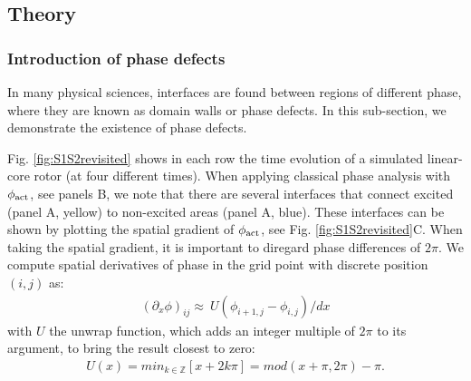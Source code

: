 \documentclass{article}
\newcommand{\phiact}{\ensuremath{\phi_{\rm act}}}
\begin{document}

\subsection{Theory}\label{sec:theory}

\subsubsection{Introduction of phase defects}

In many physical sciences, interfaces are found between regions of different phase, where they are known as domain walls or phase defects. In this sub-section, we demonstrate the existence of phase defects. 

Fig. \ref{fig:S1S2revisited} shows in each row the time evolution of a simulated linear-core rotor (at four different times). When applying classical phase analysis with $\phiact$, see panels B, we note that there are several interfaces that connect excited (panel A, yellow) to non-excited areas (panel A, blue). These interfaces can be shown by plotting the spatial gradient of $\phiact$, see Fig. \ref{fig:S1S2revisited}C. When taking the spatial gradient, it is important to diregard phase differences of $2\pi$. We compute spatial derivatives of phase in the grid point with discrete position $(i,j)$ as: 
\begin{align} 
(\partial_x \phi)_{ij} \approx \ U(\phi_{i+1,j} - \phi_{i,j})/dx
\end{align}
with $U$ the unwrap function, which adds an integer multiple of $2\pi$ to its argument, to bring the result closest to zero:
 \begin{align}
     U(x) = min_{k \in \mathbb{Z}} [ x + 2k \pi ] =  mod( x + \pi, 2\pi) - \pi.
 \end{align}
\end{document}
